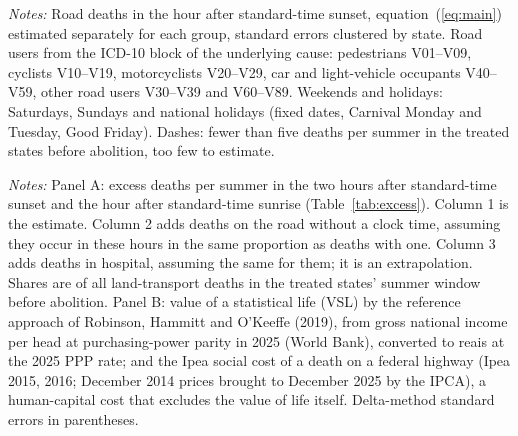 \documentclass[12pt]{article}
\newcommand{\tabdir}{../analysis/output/tables}
\newcommand{\tabnote}[1]{\begin{tablenotes}[flushleft]\footnotesize\item \textit{Notes:} #1\end{tablenotes}}
\begin{document}
\begin{table}[p]
  \centering
  \caption{Who dies in the hour that turned dark}
  \label{tab:road-users}
  \begin{threeparttable}
    \small\setlength{\tabcolsep}{5pt}
    
    \tabnote{Road deaths in the hour after standard-time sunset,
    equation~(\ref{eq:main}) estimated separately for each group, standard
    errors clustered by state. Road users from the ICD-10 block of the
    underlying cause: pedestrians V01--V09, cyclists V10--V19, motorcyclists
    V20--V29, car and light-vehicle occupants V40--V59, other road users
    V30--V39 and V60--V89. Weekends and holidays: Saturdays, Sundays and
    national holidays (fixed dates, Carnival Monday and Tuesday, Good
    Friday). Dashes: fewer than five deaths per summer in the treated states
    before abolition, too few to estimate.}
  \end{threeparttable}
\end{table}

\begin{table}[p]
  \centering
  \caption{Deaths per summer and what they are worth}
  \label{tab:cost}
  \begin{threeparttable}
    \small
    
    \tabnote{Panel A: excess deaths per summer in the two hours after
    standard-time sunset and the hour after standard-time sunrise
    (Table~\ref{tab:excess}). Column 1 is the estimate. Column 2 adds deaths on
    the road without a clock time, assuming they occur in these hours in the
    same proportion as deaths with one. Column 3 adds deaths in hospital,
    assuming the same for them; it is an extrapolation. Shares are of all
    land-transport deaths in the treated states' summer window before
    abolition. Panel B: value of a statistical life (VSL) by the reference
    approach of Robinson, Hammitt and O'Keeffe (2019), from gross national
    income per head at purchasing-power parity in 2025 (World Bank), converted
    to reais at the 2025 PPP rate; and the Ipea social cost of a death on a
    federal highway (Ipea 2015, 2016; December 2014 prices brought to December
    2025 by the IPCA), a human-capital cost that excludes the value of life
    itself.
    Delta-method standard errors in parentheses.}
  \end{threeparttable}
\end{table}
\end{document}
